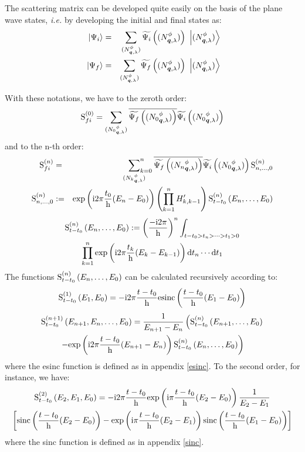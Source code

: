 The scattering matrix can be developed quite easily on the basis of the plane wave states, \textit{i.e.} by developing the initial and final states as:
\begin{eqnarray*}
\ \left|{\Psi_i}\right\rangle & = & \sum_{({N}^{\phi}_{{\boldsymbol{q}}, {\lambda}})} \widetilde{\Psi_i} \left( ({N}^{\phi}_{{\boldsymbol{q}}, {\lambda}}) \right) \ \left|{({N}^{\phi}_{{\boldsymbol{q}}, {\lambda}})}\right\rangle \\
\ \left|{\Psi_f}\right\rangle & = & \sum_{({N}^{\phi}_{{\boldsymbol{q}}, {\lambda}})} \widetilde{\Psi_f} \left( ({N}^{\phi}_{{\boldsymbol{q}}, {\lambda}}) \right) \ \left|{({N}^{\phi}_{{\boldsymbol{q}}, {\lambda}})}\right\rangle
\end{eqnarray*}

With these notations, we have to the zeroth order:
\begin{equation*}
\mathrm S_{{f}{i}}^{({0})} = \sum_{({N_0}^{\phi}_{{\boldsymbol{q}}, {\lambda}})} \overline{\widetilde{\Psi_f} \left( ({N_0}^{\phi}_{{\boldsymbol{q}}, {\lambda}}) \right) } \widetilde{\Psi_i} \left( ({N_0}^{\phi}_{{\boldsymbol{q}}, {\lambda}}) \right)
\end{equation*}
and to the n-th order:
\begin{eqnarray*}
\mathrm S_{{f}{i}}^{({n})} & = & \sideset{}{_{k=0}^n}\sum_{({N_k}^{\phi}_{{\boldsymbol{q}}, {\lambda}})} \overline{\widetilde{\Psi_f} \left( ({N_n}^{\phi}_{{\boldsymbol{q}}, {\lambda}}) \right) } \widetilde{\Psi_i} \left( ({N_0}^{\phi}_{{\boldsymbol{q}}, {\lambda}}) \right) \mathrm S^{(n)}_{n,\dotsc,0} \\
\mathrm S^{(n)}_{n,\dotsc,0} & := & \mathrm{exp} \left( {\mathrm{i} 2 \pi \frac{t_0} {\mathrm h} ( E_n - E_0 )} \right) \left( \prod_{k=1}^n H'_{k,k-1} \right) \mathrm S^{(n)}_{t - t_0}\left({E_n, \dotsc, E_0}\right)
\end{eqnarray*}
\begin{multline*}
\mathrm S^{(n)}_{t - t_0}\left({E_n, \dotsc, E_0}\right) := \left( \frac{-\mathrm{i} 2 \pi} {\mathrm h} \right)^n \int_{t - t_0 > t_n > \dotsb > t_1 > 0} \\
\prod_{k=1}^n \mathrm{exp} \left( {\mathrm{i} 2 \pi \frac{t_k} {\mathrm h} ( E_k - E_{k - 1} )} \right) \mathrm dt_n \dotsm \mathrm dt_1
\end{multline*}
The functions $\mathrm S^{(n)}_{t - t_0}\left({E_n, \dotsc, E_0}\right)$ can be calculated recursively according to:
\begin{equation*}
\mathrm S^{(1)}_{t - t_0}\left({E_1, E_0}\right) = -\mathrm{i} 2 \pi \frac{t - t_0} {\mathrm h} \mathrm{esinc} \left( {\frac{t - t_0} {\mathrm h} ( E_1 - E_0 )} \right)
\end{equation*}
\begin{multline*}
\mathrm S^{(n + 1)}_{t - t_0}\left({E_{n + 1}, E_n, \dotsc, E_0}\right) = \frac 1 {E_{n + 1} - E_n} \left( \mathrm S^{(n)}_{t - t_0}\left({E_{n + 1}, \dotsc, E_0}\right) \right. \\
\left. - \mathrm{exp} \left( {\mathrm{i} 2 \pi \frac{t - t_0} {\mathrm h} ( E_{n + 1} - E_n )} \right) \mathrm S^{(n)}_{t - t_0}\left({E_n, \dotsc, E_0}\right) \right)
\end{multline*}
where the esinc function is defined as in appendix \ref{esinc}.
To the second order, for instance, we have:
\begin{multline*}
\mathrm S^{(2)}_{t - t_0}\left({E_2, E_1, E_0}\right) = -\mathrm{i} 2 \pi \frac{t - t_0} {\mathrm h} \mathrm{exp} \left( {\mathrm{i} \pi \frac{t - t_0} {\mathrm h} ( E_2 - E_0 )} \right) \frac 1 {E_2 - E_1} \\
\left[ \mathrm{sinc} \left( {\frac{t - t_0} {\mathrm h} ( E_2 - E_0 )} \right) - \mathrm{exp} \left( {\mathrm{i} \pi \frac{t - t_0} {\mathrm h} ( E_2 - E_1 )} \right) \mathrm{sinc} \left( {\frac{t - t_0} {\mathrm h} ( E_1 - E_0 )} \right) \right]
\end{multline*}
where the sinc function is defined as in appendix \ref{sinc}.

